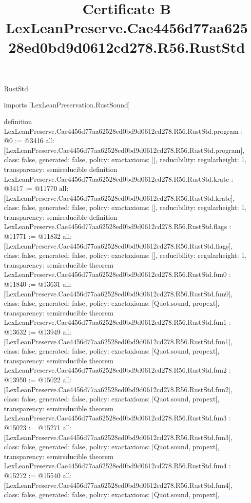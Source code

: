 \begin{lexlean}{RustStd}
\title{Certificate B LexLeanPreserve.Cae4456d77aa62528ed0bd9d0612cd278.R56.RustStd}
\begin{coremodule}
imports [LexLeanPreservation.RustSound]

definition LexLeanPreserve.Cae4456d77aa62528ed0bd9d0612cd278.R56.RustStd.program : @0 := @3416 {
  all: [LexLeanPreserve.Cae4456d77aa62528ed0bd9d0612cd278.R56.RustStd.program],
  class: false,
  generated: false,
  policy: exact{axioms: []},
  reducibility: regular{height: 1},
  transparency: semireducible
}
definition LexLeanPreserve.Cae4456d77aa62528ed0bd9d0612cd278.R56.RustStd.krate : @3417 := @11770 {
  all: [LexLeanPreserve.Cae4456d77aa62528ed0bd9d0612cd278.R56.RustStd.krate],
  class: false,
  generated: false,
  policy: exact{axioms: []},
  reducibility: regular{height: 1},
  transparency: semireducible
}
definition LexLeanPreserve.Cae4456d77aa62528ed0bd9d0612cd278.R56.RustStd.flags : @11771 := @11832 {
  all: [LexLeanPreserve.Cae4456d77aa62528ed0bd9d0612cd278.R56.RustStd.flags],
  class: false,
  generated: false,
  policy: exact{axioms: []},
  reducibility: regular{height: 1},
  transparency: semireducible
}
theorem LexLeanPreserve.Cae4456d77aa62528ed0bd9d0612cd278.R56.RustStd.fun0 : @11840 := @13631 {
  all: [LexLeanPreserve.Cae4456d77aa62528ed0bd9d0612cd278.R56.RustStd.fun0],
  class: false,
  generated: false,
  policy: exact{axioms: [Quot.sound, propext]},
  transparency: semireducible
}
theorem LexLeanPreserve.Cae4456d77aa62528ed0bd9d0612cd278.R56.RustStd.fun1 : @13632 := @13949 {
  all: [LexLeanPreserve.Cae4456d77aa62528ed0bd9d0612cd278.R56.RustStd.fun1],
  class: false,
  generated: false,
  policy: exact{axioms: [Quot.sound, propext]},
  transparency: semireducible
}
theorem LexLeanPreserve.Cae4456d77aa62528ed0bd9d0612cd278.R56.RustStd.fun2 : @13950 := @15022 {
  all: [LexLeanPreserve.Cae4456d77aa62528ed0bd9d0612cd278.R56.RustStd.fun2],
  class: false,
  generated: false,
  policy: exact{axioms: [Quot.sound, propext]},
  transparency: semireducible
}
theorem LexLeanPreserve.Cae4456d77aa62528ed0bd9d0612cd278.R56.RustStd.fun3 : @15023 := @15271 {
  all: [LexLeanPreserve.Cae4456d77aa62528ed0bd9d0612cd278.R56.RustStd.fun3],
  class: false,
  generated: false,
  policy: exact{axioms: [Quot.sound, propext]},
  transparency: semireducible
}
theorem LexLeanPreserve.Cae4456d77aa62528ed0bd9d0612cd278.R56.RustStd.fun4 : @15272 := @15540 {
  all: [LexLeanPreserve.Cae4456d77aa62528ed0bd9d0612cd278.R56.RustStd.fun4],
  class: false,
  generated: false,
  policy: exact{axioms: [Quot.sound, propext]},
}
\end{coremodule}
\end{lexlean}
